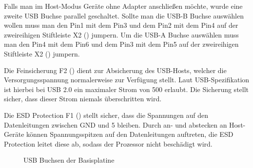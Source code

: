 Falls man im Host-Modus Geräte ohne Adapter anschließen möchte, wurde eine zweite USB Buchse parallel geschaltet. Sollte man die USB-B Buchse auswählen wollen muss man den Pin1 mit dem Pin3 und dem Pin2 mit dem Pin4 auf der zweireihigen Stiftleiste X2 () jumpern. Um die USB-A Buchse auswählen muss man den Pin4 mit dem Pin6 und dem Pin3 mit dem Pin5 auf der zweireihigen Stiftleiste X2 () jumpern.

Die Feinsicherung F2 () dient zur Absicherung des USB-Hosts, welcher die Versorgungsspannung normalerweise zur Verfügung stellt. Laut USB-Spezifikation ist hierbei bei USB 2.0 ein maximaler Strom von \unit{500}{\milli\ampere} erlaubt. Die Sicherung stellt sicher, dass dieser Strom niemals überschritten wird.

Die ESD Protection F1 () stellt sicher, dass die Spannungen auf den Datenleitungen zwischen GND und \unit{5}{\volt} bleiben. Durch an- und abstecken an Host-Geräte können Spannungsspitzen auf den Datenleitungen auftreten, die ESD Protection leitet diese ab, sodass der Prozessor nicht beschädigt wird.

\begin{figure}[H]
    \centering
    \qquad
    \qquad
    \caption[USB Buchsen der Basisplatine]{USB Buchsen der \gls{Basisplatine}}
    \label{fig:basisplatine-usb}
\end{figure}

